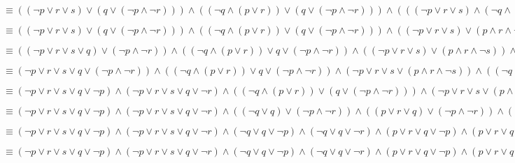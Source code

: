 \documentclass{article}
\begin{document}
$\equiv (( \lnot p \lor r \lor s) \lor (q \lor ( \lnot p \land  \lnot r))) \land (( \lnot q \land (p \lor r)) \lor (q \lor ( \lnot p \land  \lnot r))) \land ((( \lnot p \lor r \lor s) \land ( \lnot q \land (p \lor r))) \lor (p \land r \land  \lnot s))$

$\equiv (( \lnot p \lor r \lor s) \lor (q \lor ( \lnot p \land  \lnot r))) \land (( \lnot q \land (p \lor r)) \lor (q \lor ( \lnot p \land  \lnot r))) \land (( \lnot p \lor r \lor s) \lor (p \land r \land  \lnot s)) \land (( \lnot q \land (p \lor r)) \lor (p \land r \land  \lnot s))$

$\equiv (( \lnot p \lor r \lor s \lor q) \lor ( \lnot p \land  \lnot r)) \land (( \lnot q \land (p \lor r)) \lor q \lor ( \lnot p \land  \lnot r)) \land (( \lnot p \lor r \lor s) \lor (p \land r \land  \lnot s)) \land (( \lnot q \land (p \lor r)) \lor (p \land r \land  \lnot s))$

$\equiv ( \lnot p \lor r \lor s \lor q \lor ( \lnot p \land  \lnot r)) \land (( \lnot q \land (p \lor r)) \lor q \lor ( \lnot p \land  \lnot r)) \land ( \lnot p \lor r \lor s \lor (p \land r \land  \lnot s)) \land (( \lnot q \land (p \lor r)) \lor (p \land r \land  \lnot s))$

$\equiv ( \lnot p \lor r \lor s \lor q \lor  \lnot p) \land ( \lnot p \lor r \lor s \lor q \lor  \lnot r) \land (( \lnot q \land (p \lor r)) \lor (q \lor ( \lnot p \land  \lnot r))) \land ( \lnot p \lor r \lor s \lor (p \land r \land  \lnot s)) \land (( \lnot q \land (p \lor r)) \lor (p \land r \land  \lnot s))$

$\equiv ( \lnot p \lor r \lor s \lor q \lor  \lnot p) \land ( \lnot p \lor r \lor s \lor q \lor  \lnot r) \land (( \lnot q \lor q) \lor ( \lnot p \land  \lnot r)) \land ((p \lor r \lor q) \lor ( \lnot p \land  \lnot r)) \land (( \lnot p \lor r \lor s) \lor (p \land r \land  \lnot s)) \land (( \lnot q \land (p \lor r)) \lor (p \land r \land  \lnot s))$

$\equiv ( \lnot p \lor r \lor s \lor q \lor  \lnot p) \land ( \lnot p \lor r \lor s \lor q \lor  \lnot r) \land ( \lnot q \lor q \lor  \lnot p) \land ( \lnot q \lor q \lor  \lnot r) \land (p \lor r \lor q \lor  \lnot p) \land (p \lor r \lor q \lor  \lnot r) \land ( \lnot p \lor r \lor s \lor p) \land ( \lnot p \lor r \lor s \lor r) \land ( \lnot p \lor r \lor s \lor  \lnot s) \land (( \lnot q \land (p \lor r)) \lor p) \land (( \lnot q \land (p \lor r)) \lor r) \land (( \lnot q \land (p \lor r)) \lor  \lnot s)$

$\equiv ( \lnot p \lor r \lor s \lor q \lor  \lnot p) \land ( \lnot p \lor r \lor s \lor q \lor  \lnot r) \land ( \lnot q \lor q \lor  \lnot p) \land ( \lnot q \lor q \lor  \lnot r) \land (p \lor r \lor q \lor  \lnot p) \land (p \lor r \lor q \lor  \lnot r) \land ( \lnot p \lor r \lor s \lor p) \land ( \lnot p \lor r \lor s \lor r) \land ( \lnot p \lor r \lor s \lor  \lnot s) \land ( \lnot q \lor p) \land (p \lor r \lor p) \land ( \lnot q \lor r) \land (p \lor r \lor r) \land ( \lnot q \lor  \lnot s) \land (p \lor r \lor  \lnot s)$
\end{document}
